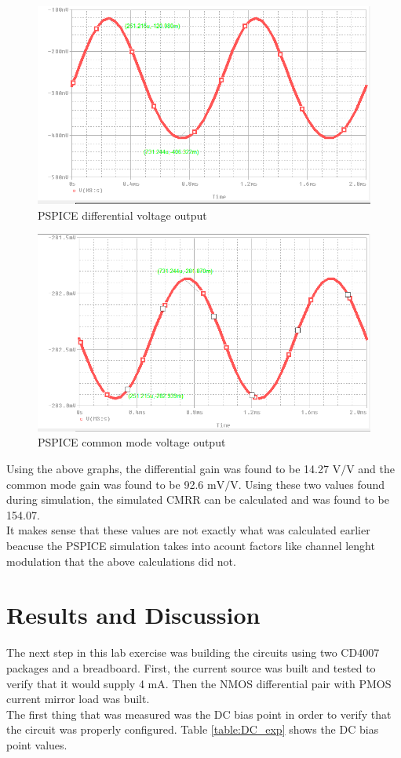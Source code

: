 \documentclass[11pt]{article}
\begin{document}
	\begin{figure}[H]
		\centering
		\includegraphics[width=4.0 in]{pspice_diff.png}
		\caption{PSPICE differential voltage output}
		\label{fig:pspice_diff}
	\end{figure}

	\begin{figure}[H]
		\centering
		\includegraphics[width=4.0 in]{pspice_common.png}
		\caption{PSPICE common mode voltage output}
		\label{fig:pspice_common}
	\end{figure}

	Using the above graphs, the differential gain was found to be 14.27
	$\si\volt/\si\volt$ and the common mode gain was found to be 92.6
	$\si{\milli\volt}/\si\volt$. Using these two values found during simulation,
	the simulated CMRR can be calculated and was found to be 154.07.\\
	\hfill \break
	It makes sense that these values are not exactly what was calculated earlier
	beacuse the PSPICE simulation takes into acount factors like channel lenght
	modulation that the above calculations did not.\\
	
	\section{Results and Discussion}
	The next step in this lab exercise was building the circuits using two
	CD4007 packages and a breadboard. First, the current source was built
	and tested to verify that it would supply 4 $\si{\milli\ampere}$. Then the
	NMOS differential pair with PMOS current mirror load was built. \\
	\hfill \break
	The first thing that was measured was the DC bias point in order to verify
	that the circuit was properly configured. Table \ref{table:DC_exp} shows the
	DC bias point values.
\end{document}
